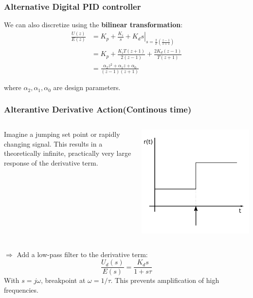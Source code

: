\begin{frame}
	\frametitle{Alternative Digital PID controller}
	We can also discretize using the \textbf{bilinear transformation}:
	\begin{align*}
		\frac{U(z)}{E(z)} &=  
				\left. K_p + \frac{K_i}{s} + K_d s \right|_
							{s=\frac{2}{T}\left( \frac{z-1}{z+1}\right)}  \\
			&= K_p + \frac{K_iT(z + 1)}{2(z-1)} + \frac{2K_d(z-1)}{T(z+1)} \\
			&= \frac{\alpha_2 z^2 + \alpha_1 z + \alpha_0}{(z-1)(z+1)}
	\end{align*}
	
	where $\alpha_2, \alpha_1, \alpha_0$ are design parameters.
	
\end{frame}

\begin{frame}
	\frametitle{Alterantive Derivative Action(Continous time)}
		\begin{columns}
			\begin{column}{0.7\linewidth}
				Imagine a jumping set point or rapidly changing signal. 
				This results in a theoretically infinite, practically very large response of
				the derivative term.  
			\end{column}
			\begin{column}{0.3\linewidth}
				\includegraphics[width=\linewidth]{img/piecewise-setpoint}
			\end{column}
		\end{columns}
		$\Rightarrow$ Add a low-pass filter to the derivative term:
		\begin{equation*}
			\frac{U_d(s)}{E(s)} = \frac{K_d s}{1+s\tau}
		\end{equation*}
		With $s=j\omega$, breakpoint at $\omega=1/\tau$. This prevents amplification of high frequencies. 
	
\end{frame}

